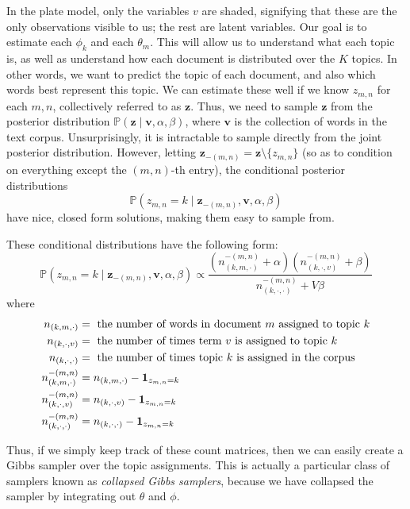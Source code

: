 In the plate model, only the variables $v$ are shaded, signifying that these are the only observations visible to us; the rest are latent variables.
Our goal is to estimate each $\phi_{k}$ and each $\theta_{m}$.
This will allow us to understand what each topic is, as well as understand how each document is distributed over the $K$ topics.
In other words, we want to predict the topic of each document, and also which words best represent this topic.
We can estimate these well if we know $z_{m,n}$ for each $m, n$, collectively referred to as $\mathbf{z}$.
Thus, we need to sample $\mathbf{z}$ from the posterior distribution $\mathbb{P}(\mathbf{z} \mid \mathbf{v}, \alpha, \beta)$, where $\mathbf{v}$ is the collection of words in the text corpus.
Unsurprisingly, it is intractable to sample directly from the joint posterior distribution.
However, letting $\mathbf{z}_{-(m,n)} = \mathbf{z}\setminus \{z_{m,n}\}$ (so as to condition on everything except the $(m,n)$-th entry), the conditional posterior distributions
\begin{equation*}
    \mathbb{P}(z_{m,n} = k \mid \mathbf{z}_{-(m,n)}, \mathbf{v}, \alpha, \beta)
\end{equation*}
have nice, closed form solutions, making them easy to sample from.

These conditional distributions have the following form:
\begin{equation*}
\mathbb{P}(z_{m,n} = k \mid \mathbf{z}_{-(m,n)}, \mathbf{v}, \alpha, \beta) \propto \frac{\left(n_{(k,m,\cdot)}^{-(m,n)} + \alpha\right)\left(n_{(k, \cdot, v)}^{-(m,n)} + \beta\right)}{n_{(k,\cdot,\cdot)}^{-(m,n)} + V \beta}
\end{equation*}
where
\begin{align*}
n_{(k,m,\cdot)} & = \mbox{ the number of words in document $m$ assigned to topic $k$} \\
n_{(k,\cdot,v)} & = \mbox{ the number of times term $v$ is assigned to topic $k$} \\
n_{(k,\cdot,\cdot)} & = \mbox{ the number of times topic $k$ is assigned in the corpus} \\
n_{(k,m,\cdot)}^{-(m,n)} & = n_{(k,m,\cdot)} - \boldsymbol{1}_{z_{m,n} = k} \\
n_{(k,\cdot,v)}^{-(m,n)} & = n_{(k,\cdot,v)} - \boldsymbol{1}_{z_{m,n} = k} \\
n_{(k,\cdot,\cdot)}^{-(m,n)} & = n_{(k,\cdot,\cdot)} - \boldsymbol{1}_{z_{m,n} = k}
\end{align*}

Thus, if we simply keep track of these count matrices, then we can easily create a Gibbs sampler over the topic assignments.
This is actually a particular class of samplers known as \emph{collapsed Gibbs samplers}, because we have collapsed the sampler by integrating out $\theta$ and $\phi$.

